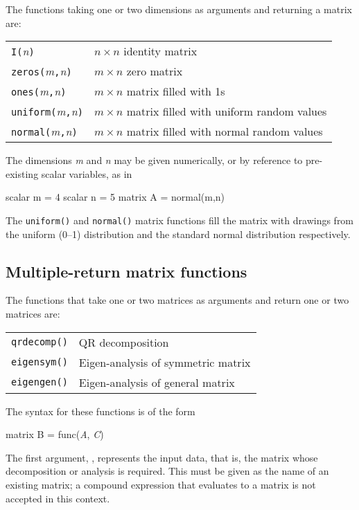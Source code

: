 The functions taking one or two dimensions as arguments and returning
a matrix are:

\begin{center}
\begin{tabular}{ll}
\texttt{I(}\textsl{n}\texttt{)} & $n\times n$ identity matrix \\
\texttt{zeros(}\textsl{m}\texttt{,}\textsl{n}\texttt{)} & 
   $m\times n$ zero matrix \\
\texttt{ones(}\textsl{m}\texttt{,}\textsl{n}\texttt{)} &
   $m\times n$ matrix filled with 1s \\
\texttt{uniform(}\textsl{m}\texttt{,}\textsl{n}\texttt{)} &
   $m\times n$ matrix filled with uniform random values \\
\texttt{normal(}\textsl{m}\texttt{,}\textsl{n}\texttt{)} &
   $m\times n$ matrix filled with normal random values \\
\end{tabular}
\end{center}

The dimensions \textsl{m} and \textsl{n} may be given numerically, or
by reference to pre-existing scalar variables, as in
%
\begin{code}
scalar m = 4
scalar n = 5
matrix A = normal(m,n)
\end{code}
%
The \texttt{uniform()} and \texttt{normal()} matrix functions fill the
matrix with drawings from the uniform (0--1) distribution and the
standard normal distribution respectively.

\subsection{Multiple-return matrix functions}
\label{matrix-multiples}

The functions that take one or two matrices as arguments and return
one or two matrices are:

\begin{center}
\begin{tabular}{ll}
\texttt{qrdecomp()} & QR decomposition \\
\texttt{eigensym()} & Eigen-analysis of symmetric matrix \\
\texttt{eigengen()} & Eigen-analysis of general matrix 
\end{tabular}
\end{center}

The syntax for these functions is of the form
%
\begin{textcode}
matrix B = func(\textsl{A}, \textsl{C})
\end{textcode}
%
The first argument, , represents the input data, that is, the
matrix whose decomposition or analysis is required.  This must be
given as the name of an existing matrix; a compound expression that
evaluates to a matrix is not accepted in this context.

